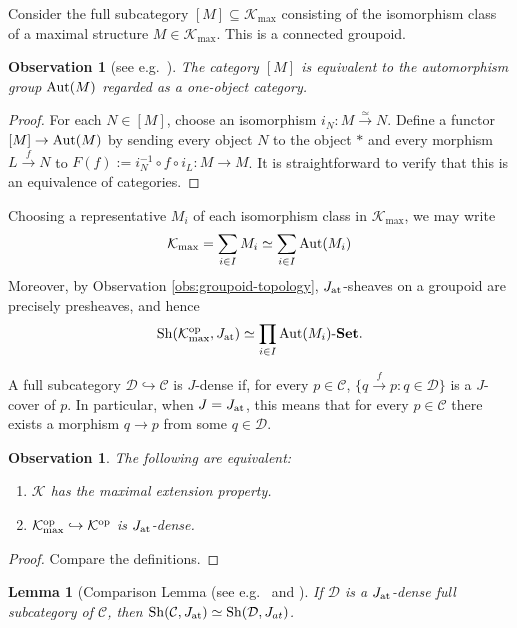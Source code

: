 \documentclass[10pt]{amsart}
\numberwithin{equation}{section}
\theoremstyle{plain}
\newtheorem{lemma}[theorem]{Lemma}
\newtheorem{obs}[theorem]{Observation}
\theoremstyle{definition}
\newcommand{\C}{\mathcal{C}}
\newcommand{\D}{\mathcal{D}}
\newcommand{\K}{\mathcal{K}}
\newcommand{\embed}{\hookrightarrow}
\newcommand{\edge}[1]{\overset{#1}{\longrightarrow}}
\begin{document}
Consider the full subcategory $[M]\subseteq\K_{\max}$ consisting of the isomorphism class of a maximal structure $M\in\K_{\max}$.
This is a connected groupoid.
\begin{obs}[see e.g.~{\cite[Proposition 1.5.13]{Riehlbook}}]\label{obs:Riehl}
The category $[M]$ is equivalent to the automorphism group ${\rm Aut}(M)$ regarded as a one-object category.
\end{obs}

\begin{proof}
For each $N\in[M]$, choose an isomorphism $i_N\colon M\edge{\simeq} N$.
Define a functor $[M]\to{\rm Aut}(M)$ by sending every object $N$ to the object $\ast$ and every morphism $L\edge{f}N$ to $F(f):=i_N^{-1}\circ f\circ i_L\colon M\to M$.
It is straightforward to verify that this is an equivalence of categories.
\end{proof}

Choosing a representative $M_i$ of each isomorphism class in $\K_{\max}$, we may write
\[\K_{\max}=\sum_{i\in I}M_i\simeq\sum_{i\in I}{\rm Aut}(M_i)\]
Moreover, by Observation \ref{obs:groupoid-topology}, $J_{\rm at}$-sheaves on a groupoid are precisely presheaves, and hence
\[
{\rm Sh}(\K_{\rm max}^{\rm op},J_{\rm at})\simeq\prod_{i\in I}{\rm Aut}(M_i)\text{-}{\bf Set}.
\]


A full subcategory $\D\embed\C$ is $J$-dense if, for every $p\in\C$, $\{q\edge{f}p:q\in\D\}$ is a $J$-cover of $p$.
In particular, when $J=J_{\rm at}$, this means that for every $p\in \C$ there exists a morphism $q\to p$ from some $q\in \D$.

\begin{obs}
The following are equivalent:
\begin{enumerate}
\item $\K$ has the maximal extension property.
\item $\K^{\rm op}_{\rm max}\embed\K^{\rm op}$ is $J_{\rm at}$-dense.
\end{enumerate}
\end{obs}

\begin{proof}
Compare the definitions.
\end{proof}

\begin{lemma}[Comparison Lemma (see e.g.~{\cite[p.~590]{SGL}} and {\cite[C2.2.3]{Elephant2}}]
If $\D$ is a $J_{\rm at}$-dense full subcategory of $\C$, then ${\rm Sh}(\C,J_{\rm at})\simeq{\rm Sh}(\D,J_{at})$.
\end{lemma}
\end{document}
